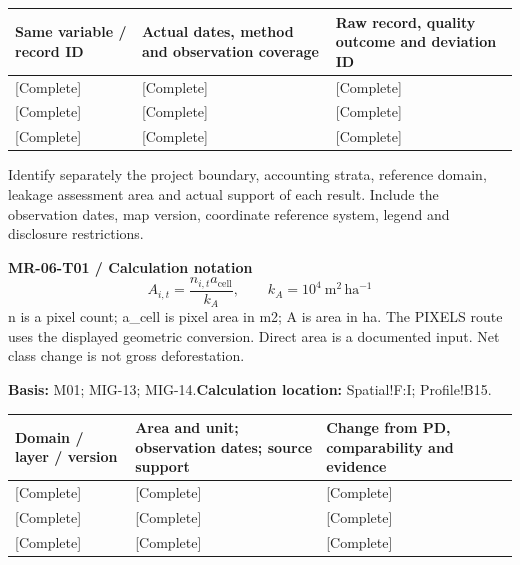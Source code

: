 {\sffamily\fontsize{8.6}{10.7}\selectfont\begin{longtable}{@{}P{48mm}P{61mm}P{53mm}@{}}
\toprule
\textbf{Same variable / record ID} & \textbf{Actual dates, method and observation coverage} & \textbf{Raw record, quality outcome and deviation ID}\\\midrule\endhead
\rule{0pt}{8mm}[Complete] & [Complete] & [Complete]\\\hline
\rule{0pt}{8mm}[Complete] & [Complete] & [Complete]\\\hline
\rule{0pt}{8mm}[Complete] & [Complete] & [Complete]\\\hline
\end{longtable}}
Identify separately the project boundary, accounting strata, reference domain, leakage assessment area and actual support of each result. Include the observation dates, map version, coordinate reference system, legend and disclosure restrictions.\par
{}
\ProjectMapBox
{}
\par\begingroup\sffamily\fontsize{8.4}{10.5}\selectfont\color{NEBGreen}
\textbf{MR-06-T01 / Calculation notation}\
{\fontsize{10}{12}\selectfont\[A_{i,t}=\frac{n_{i,t}a_{\mathrm{cell}}}{k_A},\qquad k_A=10^4\ \mathrm{m^2\,ha^{-1}}\]}
n is a pixel count; a\_cell is pixel area in m2; A is area in ha. The PIXELS route uses the displayed geometric conversion. Direct area is a documented input. Net class change is not gross deforestation.\par
\textbf{Basis:} M01; MIG-13; MIG-14.\quad\textbf{Calculation location:} Spatial!F:I; Profile!B15.\par\endgroup
{\sffamily\fontsize{8.6}{10.7}\selectfont\begin{longtable}{@{}P{48mm}P{61mm}P{53mm}@{}}
\toprule
\textbf{Domain / layer / version} & \textbf{Area and unit; observation dates; source support} & \textbf{Change from PD, comparability and evidence}\\\midrule\endhead
\rule{0pt}{8mm}[Complete] & [Complete] & [Complete]\\\hline
\rule{0pt}{8mm}[Complete] & [Complete] & [Complete]\\\hline
\rule{0pt}{8mm}[Complete] & [Complete] & [Complete]\\\hline
\end{longtable}}
